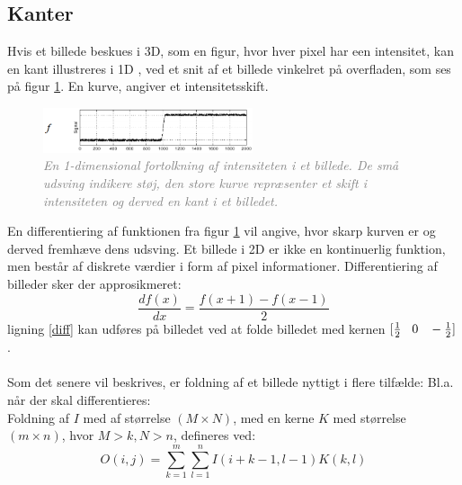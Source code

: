 \subsection{Kanter}\label{subsec:kant}
Hvis et billede beskues i 3D, som en figur, hvor hver pixel har een intensitet, kan en kant illustreres i 1D , ved et snit af et billede vinkelret på overfladen, som ses på figur \ref{fig:kant}. En kurve, angiver et intensitetsskift.
\noindent
\begin{figure}[H]
    \centering
    \includegraphics[width=0.55\textwidth]{fig/7.png}
     \vspace{-1em}
    \begin{center}        
     \caption{\textcolor{gray}{\footnotesize \textit{
     En 1-dimensional fortolkning af intensiteten i et billede. De små udsving indikere støj, den store kurve repræsenter et skift i intensiteten og derved en kant i et billedet.}}}
    \label{fig:kant}
     \end{center}
       \vspace{-2.5em}
  \end{figure}
\noindent
En differentiering af funktionen fra figur \ref{fig:kant} vil angive, hvor skarp kurven er og derved fremhæve dens udsving. Et billede i 2D er ikke en kontinuerlig funktion, men består af diskrete værdier i form af pixel informationer.
Differentiering af billeder sker der approsikmeret: \begin{equation}
\dfrac{df(x)}{dx}=\dfrac{f(x+1)-f(x-1)}{2}
\label{diff}
\end{equation}
ligning \eqref{diff} kan udføres på billedet ved at folde billedet med kernen $[\frac{1}{2} \hspace{0.3cm} 0 \hspace{0.3cm} -\frac{1}{2}]$. 
\\
\\
Som det senere vil beskrives, er foldning af et billede nyttigt i flere tilfælde: Bl.a. når der skal differentieres:
\\
Foldning af $I$ med af størrelse $(M \times N)$, med en kerne $K$ med størrelse $(m \times n)$, hvor $M > k, N > n$, defineres ved:
\begin{equation}
O(i,j) = \sum\limits_{k=1}^m \sum\limits_{l=1}^n I(i+k-1,l-1)K(k,l)
\end{equation}
\\
